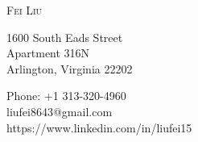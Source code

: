 
\begin{center}

%

\textsc{\Large Fei Liu}\\[0.25cm]

%

\begin{minipage}{0.4\textwidth}
\begin{flushleft}%
1600 South Eads Street \\
Apartment 316N \\
Arlington, Virginia 22202 \\
\end{flushleft}
\end{minipage}
\begin{minipage}{0.4\textwidth}
\begin{flushright} %
Phone: +1 313-320-4960 \\
liufei8643@gmail.com \\
https://www.linkedin.com/in/liufei15
\end{flushright}
\end{minipage}



\end{center}
